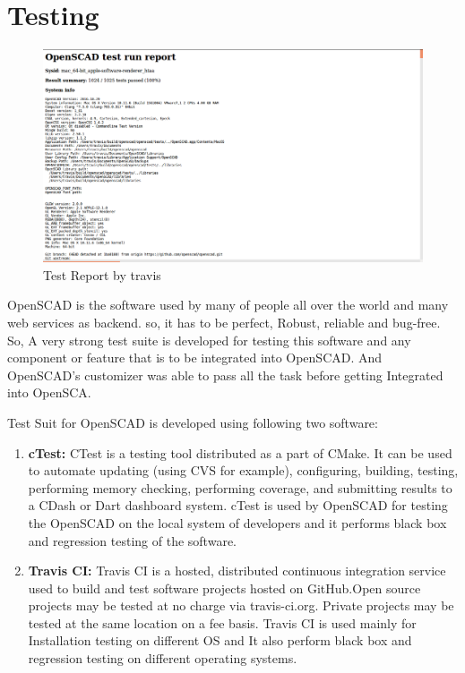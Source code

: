 \section{Testing}

\begin{figure}[H]
    \centering
    \includegraphics[width=\linewidth]{images/travisTestReport}
    \caption{Test Report by travis}
    \label{fig:travisTestReport}
\end{figure}

OpenSCAD is the software used by many of people all over the world and many web services as backend. so, it has to be perfect, Robust, reliable and bug-free. So, A very strong test suite is developed for testing this software and any component or feature that is to be integrated into OpenSCAD. And OpenSCAD's customizer was able to pass all the task before getting Integrated into OpenSCA.

Test Suit for OpenSCAD is developed using following two software:

\begin{enumerate}
    \item \textbf{cTest:} CTest is a testing tool distributed as a part of CMake. It can be used to automate updating (using CVS for example), configuring, building, testing, performing memory checking, performing coverage, and submitting results to a CDash or Dart dashboard system.
    cTest is used by OpenSCAD for testing the OpenSCAD on the local system of developers and it performs black box and regression testing of the software.
   
    \item \textbf{Travis CI:} Travis CI is a hosted, distributed continuous integration service used to build and test software projects hosted on GitHub.Open source projects may be tested at no charge via travis-ci.org. Private projects may be tested at the same location on a fee basis.
    Travis CI is used mainly for Installation testing on different OS and It also perform  black box and regression testing on different operating systems.
   
\end{enumerate}

